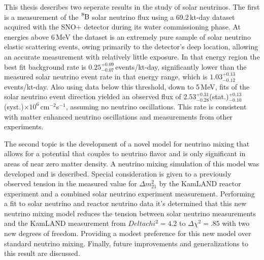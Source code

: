 

\begin{abstracts}
    This thesis describes two seperate results in the study of solar neutrinos.
    The first is
    a measurement of the $\ce{^{8}B}$ solar neutrino flux using a
    69.2\,kt-day dataset acquired with the
    SNO+ detector during its water
    commissioning phase.
    At energies above 6\,MeV the dataset is an extremely
    pure sample of solar neutrino elastic scattering events, owing primarily to
    the detector's deep location, allowing
    an accurate measurement with relatively little exposure. In that energy
    region the best fit background rate is
    $0.25^{+0.09}_{-0.07}$\,events/kt-day, significantly
    lower than the measured solar neutrino event rate in that energy range,
    which is $1.03^{+0.13}_{-0.12}$\,events/kt-day. Also using data below this threshold, down
    to 5\,MeV, fits of the solar neutrino event direction yielded an observed
    flux of
    $2.53^{+0.31}_{-0.28}$(stat.)$^{+0.13}_{-0.10}$(syst.)$\times10^6$\,cm$^{-2}$s$^{-1}$,
    assuming no neutrino oscillations. This rate is
    consistent with matter enhanced neutrino oscillations and measurements from
    other experiments.

    The second topic is the development of a novel model for neutrino mixing
    that allows for a potential that couples to neutrino
    flavor and is only significant in areas of near zero matter density.
    A neutrino mixing simulation of this model was developed and is described.
    Special consideration
    is given to a previously observed tension in the measured value
    for $\Delta m^{2}_{21}$ by the KamLAND reactor experiment and
    a combined solar neutrino experiment measurement.
    Performing a fit to solar neutrino and reactor neutrino
    data it's determined that this new neutrino mixing model reduces the tension
    between solar neutrino measurements and the KamLAND measurement
    from $Delta chi^{2}=4.2$ to $\Delta \chi^{2}=.85$ with
    two new degrees of freedom.
    Providing a modest preference for this new model over standard neutrino mixing.
    Finally, future improvements and generalizations to this result are discussed.
\end{abstracts}

